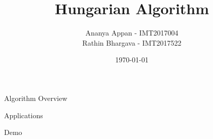 \documentclass[letterpaper,12pt]{article}
\theoremstyle{plain}
\theoremstyle{definition}
\theoremstyle{remark}
\begin{document}
	
	\title{Hungarian Algorithm}
	\author{Ananya Appan - IMT2017004 \\ Rathin Bhargava - IMT2017522}
	\date{\today}
	\maketitle
	\tableofcontents
	\newpage

    \begin{section}{Algorithm Overview}

    \end{section}
    
    \begin{section}{Applications}
    
    \end{section}
    
    \begin{section}{Demo}
        
    \end{section}
%	
%	
	
	
\end{document}
